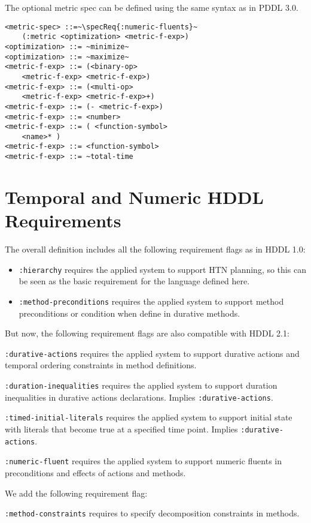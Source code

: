 \documentclass[letterpaper]{article} %
\begin{document}
%
%

The optional metric spec can be defined using the same syntax as in PDDL 3.0.

\begin{lstlisting}[firstnumber=last, escapechar=~]
<metric-spec> ::=~\specReq{:numeric-fluents}~
    (:metric <optimization> <metric-f-exp>)
<optimization> ::= ~minimize~
<optimization> ::= ~maximize~
<metric-f-exp> ::= (<binary-op>
    <metric-f-exp> <metric-f-exp>)
<metric-f-exp> ::= (<multi-op>
    <metric-f-exp> <metric-f-exp>+)
<metric-f-exp> ::= (- <metric-f-exp>)
<metric-f-exp> ::= <number>
<metric-f-exp> ::= ( <function-symbol>
    <name>* )
<metric-f-exp> ::= <function-symbol>
<metric-f-exp> ::= ~total-time
\end{lstlisting}

\section{Temporal and Numeric HDDL Requirements}
\label{Sec:Requirements}
The overall definition includes all the following requirement flags as in HDDL 1.0:
\begin{itemize}
 \item \verb+:hierarchy+ requires the applied system to support HTN planning, so this can be seen as the basic requirement for the language defined here.
 \item \verb+:method-preconditions+ requires the applied system to support method preconditions or condition when define in durative methods.
\end{itemize}
But now, the following requirement flags are also compatible with HDDL 2.1:
\begin{description}
 \item \verb+:durative-actions+ requires the applied system to support durative actions and temporal ordering constraints in method definitions.
 \item \verb+:duration-inequalities+ requires the applied system to support duration inequalities in durative actions declarations. Implies \verb+:durative-actions+.
 \item \verb+:timed-initial-literals+ requires the applied system to support initial state with literals that become true at a specified time point. Implies \verb+:durative-actions+.
 \item \verb+:numeric-fluent+ requires the applied system to support numeric fluents in preconditions and effects of actions and methods.
 \end{description}
 We add the following requirement flag:
\begin{description}
\item \verb+:method-constraints+ requires to specify decomposition constraints in methods.
 \end{description}


\end{document}
